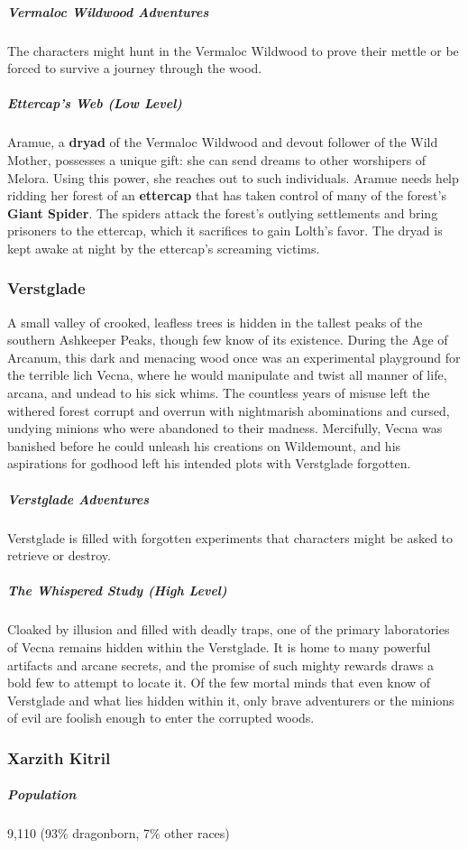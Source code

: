 \documentclass[10pt,a4paper,twoside,bg=print,twocolumn,openany,nodeprecatedcode]{dndbook}
\begin{document}
\subparagraph{Vermaloc Wildwood Adventures}
The characters might hunt in the Vermaloc Wildwood to prove their mettle or be forced to survive a journey through the wood.

\subparagraph{Ettercap's Web (Low Level)}
Aramue, a \textbf{dryad} of the Vermaloc Wildwood and devout follower of the Wild Mother, possesses a unique gift: she can send dreams to other worshipers of Melora. Using this power, she reaches out to such individuals. Aramue needs help ridding her forest of an \textbf{ettercap} that has taken control of many of the forest's \textbf{Giant Spider}. The spiders attack the forest's outlying settlements and bring prisoners to the ettercap, which it sacrifices to gain Lolth's favor. The dryad is kept awake at night by the ettercap's screaming victims.

\subsubsection{Verstglade}
A small valley of crooked, leafless trees is hidden in the tallest peaks of the southern Ashkeeper Peaks, though few know of its existence. During the Age of Arcanum, this dark and menacing wood once was an experimental playground for the terrible lich Vecna, where he would manipulate and twist all manner of life, arcana, and undead to his sick whims. The countless years of misuse left the withered forest corrupt and overrun with nightmarish abominations and cursed, undying minions who were abandoned to their madness. Mercifully, Vecna was banished before he could unleash his creations on Wildemount, and his aspirations for godhood left his intended plots with Verstglade forgotten.

\subparagraph{Verstglade Adventures}
Verstglade is filled with forgotten experiments that characters might be asked to retrieve or destroy.

\subparagraph{The Whispered Study (High Level)}
Cloaked by illusion and filled with deadly traps, one of the primary laboratories of Vecna remains hidden within the Verstglade. It is home to many powerful artifacts and arcane secrets, and the promise of such mighty rewards draws a bold few to attempt to locate it. Of the few mortal minds that even know of Verstglade and what lies hidden within it, only brave adventurers or the minions of evil are foolish enough to enter the corrupted woods.

\subsubsection{Xarzith Kitril}
\subparagraph{Population}
9,110 (93\% dragonborn, 7\% other races)
\end{document}
